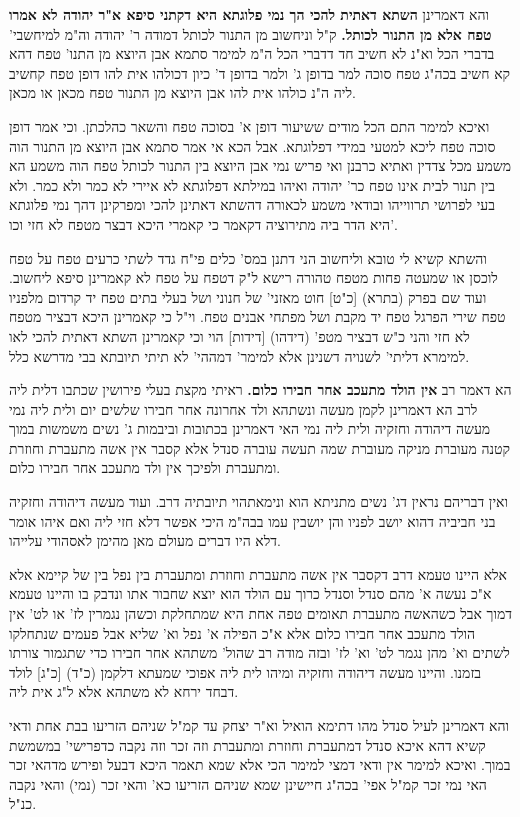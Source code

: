 \documentclass[12pt, openany]{book}
\newcommand{\sethebfont}{
\fontsize{10.5pt}{21.0pt} \selectfont
}
\newcommand{\twocol}[1]{
	{\sethebfont \begin{multicols}{2}
			#1
	\end{multicols}}	
}
\begin{document}
\twocol{והא דאמרינן \textbf{השתא דאתית להכי הך נמי פלוגתא היא דקתני סיפא א"ר יהודה לא אמרו טפח אלא מן התנור לכותל.}  ק"ל וניחשוב מן התנור לכותל דמודה ר' יהודה וה"מ למיחשבי' בדברי הכל וא"נ לא חשיב חד דדברי הכל ה"מ למימר סתמא אבן היוצא מן התנו' טפח דהא קא חשיב בכה"ג טפח סוכה למר בדופן ג' ולמר בדופן ד' כיון דכולהו אית להו דופן טפח קחשיב ליה ה"נ כולהו אית להו אבן היוצא מן התנור טפח מכאן או מכאן.\par  ואיכא למימר התם הכל מודים ששיעור דופן א' בסוכה טפח והשאר כהלכתן. וכי אמר דופן סוכה טפח ליכא למטעי במידי דפלוגתא. אבל הכא אי אמר סתמא אבן היוצא מן התנור הוה משמע מכל צדדין ואתיא כרבנן ואי פריש נמי אבן היוצא בין התנור לכותל טפח הוה משמע הא בין תנור לבית אינו טפח כר' יהודה ואיהו במילתא דפלוגתא לא איירי לא כמר ולא כמר. ולא בעי לפרושי תרווייהו ובודאי משמע לכאורה דהשתא דאתינן להכי ומפרקינן דהך נמי פלוגתא היא הדר ביה מתירוציה דקאמר כי קאמרי היכא דבצר מטפח לא חזי וכו'.\par  והשתא קשיא לי טובא וליחשוב הני דתנן במס' כלים פי"ח גדד לשתי כרעים טפח על טפח לוכסן או שמעטה פחות מטפח טהורה רישא ל"ק דטפח על טפח לא קאמרינן סיפא ליחשוב. ועוד שם בפרק (בתרא) [כ"ט] חוט מאזני' של חנוני ושל בעלי בתים טפח יד קרדום מלפניו טפח שירי הפרגל טפח יד מקבת ושל מפתחי אבנים טפח. וי"ל כי קאמרינן היכא דבציר מטפח לא חזי והני כ"ש דבציר מטפ' (דידהו) [דידות] הוי וכי קאמרינן השתא דאתית להכי לאו למימרא דליתי' לשנויה דשנינן אלא למימר' דמההי' לא תיתי תיובתא בבי מדרשא כלל. 
\par הא דאמר רב \textbf{אין הולד מתעכב אחר חבירו כלום.}  ראיתי מקצת בעלי פירושין שכתבו דלית ליה לרב הא דאמרינן לקמן מעשה ונשתהא ולד אחרונה אחר חבירו שלשים יום ולית ליה נמי מעשה דיהודה וחזקיה ולית ליה נמי האי דאמרינן בכתובות וביבמות ג' נשים משמשות במוך קטנה מעוברת מניקה מעוברת שמה תעשה עוברה סנדל אלא קסבר אין אשה מתעברת וחוזרת ומתעברת ולפיכך אין ולד מתעכב אחר חבירו כלום.\par ואין דבריהם נראין דג' נשים מתניתא הוא ונימאתהוי תיובתיה דרב. ועוד מעשה דיהודה וחזקיה בני חביביה דהוא יושב לפניו והן יושבין עמו בבה"מ היכי אפשר דלא חזי ליה ואם איהו אומר דלא היו דברים מעולם מאן מהימן לאסהודי עלייהו.\par  אלא היינו טעמא דרב דקסבר אין אשה מתעברת וחוזרת ומתעברת בין נפל בין של קיימא אלא א"כ נעשה א' מהם סנדל וסנדל כרוך עם הולד הוא יוצא שחבור אתו ונדבק בו והיינו טעמא דמוך אבל כשהאשה מתעברת תאומים טפה אחת היא שמתחלקת וכשהן נגמרין לז' או לט' אין הולד מתעכב אחר חבירו כלום אלא א"כ הפילה א' נפל וא' שליא אבל פעמים שנתחלקו לשתים וא' מהן נגמר לט' וא' לז' ובזה מודה רב שהול' משתהא אחר חבירו כדי שתגמור צורתו בזמנו. והיינו מעשה דיהודה וחזקיה ומיהו לית ליה אפוכי שמעתא דלקמן (כ"ד) [כ"ג] לולד דבחד ירחא לא משתהא אלא ל"ג אית ליה.\par  והא דאמרינן לעיל סנדל מהו דתימא הואיל וא"ר יצחק עד קמ"ל שניהם הזריעו בבת אחת ודאי קשיא דהא איכא סנדל דמתעברת וחוזרת ומתעברת וזה זכר וזה נקבה כדפרישי' במשמשת במוך. ואיכא למימר אין ודאי דמצי למימר הכי אלא שמא תאמר היכא דבעל ופירש מדהאי זכר האי נמי זכר קמ"ל אפי' בכה"ג חיישינן שמא שניהם הזריעו כא' והאי זכר (נמי) והאי נקבה כנ"ל. 
}
\end{document}
